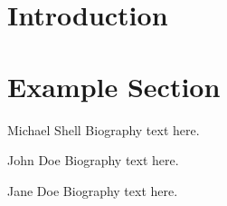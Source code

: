 \documentclass[journal]{IEEEtran}
\begin{document}
\section{Introduction}


\section{Example Section}






\ifCLASSOPTIONcaptionsoff
  \newpage
\fi




% 


\begin{IEEEbiography}{Michael Shell}
Biography text here.
\end{IEEEbiography}

\begin{IEEEbiographynophoto}{John Doe}
Biography text here.
\end{IEEEbiographynophoto}


\begin{IEEEbiographynophoto}{Jane Doe}
Biography text here.
\end{IEEEbiographynophoto}
\end{document}
